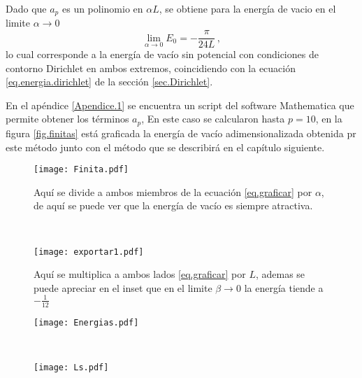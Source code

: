 Dado que $a _p$ es un polinomio en $\alpha L$, se obtiene para la energía de vacio en el limite $\alpha \rightarrow 0$
\begin{equation}
\lim \limits_{\alpha \rightarrow 0} E _0 = 
		- \frac{\pi}{24 L}
\, ,
\end{equation}
lo cual corresponde a la energía de vacío sin potencial con condiciones de contorno Dirichlet en ambos extremos, coincidiendo   con la ecuación \ref{eq.energia.dirichlet} de la sección \ref{sec.Dirichlet}.

En el apéndice \ref{Apendice.1} se encuentra un script del software Mathematica que permite obtener los términos $a _p$, En este caso se calcularon hasta $p=10$, en la figura \ref{fig.finitas} está graficada la energía de vacío adimensionalizada obtenida pr este método junto con el método que se describirá en el capítulo siguiente.



\begin{figure*}[t!]
    \centering
    \begin{subfigure}[t]{0.5\textwidth}
        \centering
        \texttt{[image: Finita.pdf]}
        \caption{Aquí se divide a ambos miembros de la ecuación \ref{eq.graficar} por $				\alpha$, de aquí se puede ver que la energía de vacío es siempre atractiva.}
        \label{fig.izquierda}
    \end{subfigure}%
    ~ 
    \begin{subfigure}[t]{0.5\textwidth}
        \centering
        \texttt{[image: exportar1.pdf]}
        \caption{Aquí se multiplica a ambos lados \ref{eq.graficar} por $L$, ademas 				se puede apreciar en el inset que en el limite $\beta \rightarrow 0$ la energía 		tiende a $- \frac{1}{12}$}
        \label{fig.derecha}
    \end{subfigure}
    \caption{En esta imagen se muestran dos posibles adimensionalizaciones de la ecuación \ref{eq.graficar}, que representan la energía de vacío independiente de $\mu$ .}
\label{fig.finitas}
\end{figure*}

\begin{figure*}[t!]
    \centering
    \begin{subfigure}[t]{0.5\textwidth}
        \centering
        \texttt{[image: Energias.pdf]}
        \caption{}
    \end{subfigure}%
    ~ 
    \begin{subfigure}[t]{0.5\textwidth}
        \centering
        \texttt{[image: Ls.pdf]}
        \caption{}
    \end{subfigure}
    \caption{En esta imagen se muestra la energía de Casimir $E _0$ para distintos valores de $\alpha$ en función de la longitud del intervalo $L$, puede verse que a medida que incrementa $\alpha$ la energía de vacío posee un máximo local mas abrupto.}
\label{fig:vacios}
\end{figure*}

